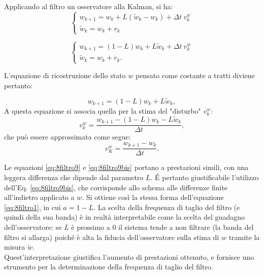 Applicando al filtro un osservatore alla Kalman, si ha:
\begin{equation}
\label{eq:8filtro6}
\left\{
\begin{array}{l}
w_{k+1} = w_k+L(\tilde{w}_k-w_k)+\Delta t~ v^w_k\\
\tilde{w}_k = w_k +r_k
\end{array}\right.
\end{equation}

\begin{equation}
\label{eq:8filtro7}
\left\{
\begin{array}{l}
w_{k+1} = (1-L)w_k+L\tilde{w}_k+\Delta t~ v^w_k\\
\tilde{w}_k = w_k +r_k.
\end{array}\right.
\end{equation}

L'equazione di ricostruzione dello stato $w$ pensato come costante a tratti diviene pertanto:

\begin{equation}
\label{eq:8filtro8}
w_{k+1} = (1-L)w_k+L\tilde{w}_k,
\end{equation}
A questa equazione si associa quella per la stima del "disturbo" $v^w_k$:
\begin{equation}
\label{eq:8filtro9}
v^w_k = \frac{w_{k+1}-(1-L)w_k-L\tilde{w}_k}{\Delta t},
\end{equation}
che può essere approssimata come segue:
\begin{equation}
\label{eq:8filtro9bis}
v^w_K = \frac{w_{k+1}-w_k}{\Delta t}.
\end{equation}

Le equazioni \eqref{eq:8filtro9} e \eqref{eq:8filtro9bis} portano a prestazioni simili, con una leggera differenza che dipende dal parametro $L$. \'E pertanto giustificabile l'utilizzo dell'Eq. \eqref{eq:8filtro9bis}, che corrisponde allo schema alle differenze finite all'indietro applicato a $w$.
Si ottiene così la stessa forma dell'equazione \eqref{eq:8filtro1}, in cui $a=1-L$. La scelta della frequenza di taglio del filtro (e quindi della sua banda) è in realtà interpretabile come la scelta del guadagno dell'osservatore: se $L$ è prossimo a $0$ il sistema tende a non filtrare (la banda del filtro si allarga) poiché è alta la fiducia dell'osservatore sulla stima di $w$ tramite la misura $\tilde{w}$.\\

Quest'interpretazione giustifica l'aumento di prestazioni ottenuto, e fornisce uno strumento per la determinazione della frequenza di taglio del filtro. 
